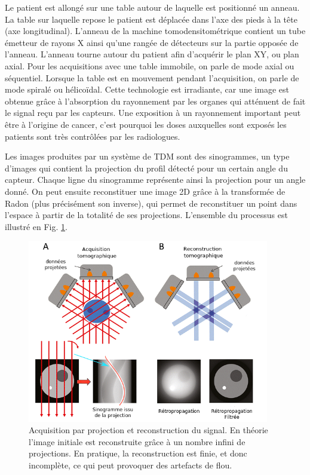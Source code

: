 Le patient est allongé sur une table autour de laquelle est positionné un anneau. La table sur laquelle repose le patient est déplacée dans l'axe des pieds à la tête (axe longitudinal). L'anneau de la machine tomodensitométrique contient un tube émetteur de rayons X ainsi qu'une rangée de détecteurs sur la partie opposée de l'anneau. L'anneau tourne autour du patient afin d'acquérir le plan XY, ou plan axial. Pour les acquisitions avec une table immobile, on parle de mode axial ou séquentiel. Lorsque la table est en mouvement pendant l'acquisition, on parle de mode spiralé ou hélicoïdal. Cette technologie est irradiante, car une image est obtenue grâce à l'absorption du rayonnement par les organes qui atténuent de fait le signal reçu par les capteurs.  Une exposition à un rayonnement important peut être à l'origine de cancer, c'est pourquoi les doses auxquelles sont exposés les patients sont très contrôlées par les radiologues.

Les images produites par un système de TDM sont des sinogrammes, un type d'images qui contient la projection du profil détecté pour un certain angle du capteur. Chaque ligne du sinogramme représente ainsi la projection pour un angle donné. On peut ensuite reconstituer une image 2D grâce à la transformée de Radon (plus précisément son inverse), qui permet de reconstituer un point dans l'espace à partir de la totalité de ses projections. L'ensemble du processus est illustré en Fig. \ref{fig:tomography}.
\begin{figure}
    \centering
    \includegraphics[height=8cm]{Images/Tomo_projection_2.png}
    \caption{Acquisition par projection et reconstruction du signal. En théorie l'image initiale est reconstruite grâce à un nombre infini de projections. En pratique, la reconstruction est finie, et donc incomplète, ce qui peut provoquer des artefacts de flou.}
    \label{fig:tomography}
\end{figure}
